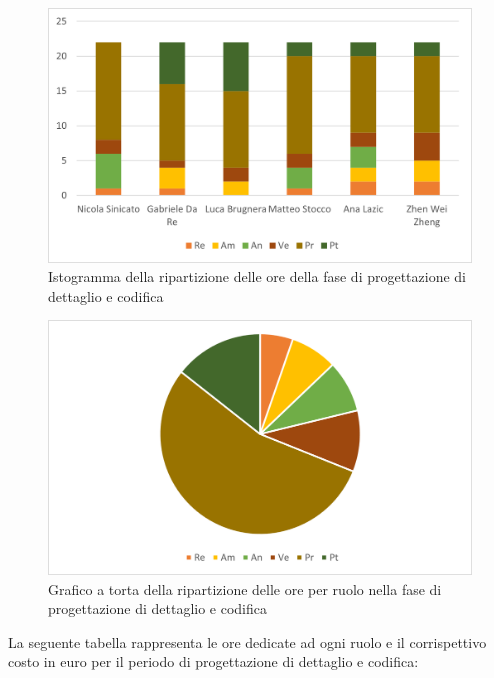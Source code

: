 \begin{figure}[H]
    \centering
    \includegraphics[scale=0.6]{img/grafi preventivo/istogrammi/codifica/complessivo.png}
    \caption{Istogramma della ripartizione delle ore della fase di progettazione di dettaglio e codifica}
\end{figure}
\begin{figure}[H]
    \centering
    \includegraphics[scale=0.6]{img/grafi preventivo/torta/codifica/complessivo.png}
    \caption{Grafico a torta della ripartizione delle ore per ruolo nella fase di progettazione di dettaglio e codifica}
\end{figure}
La seguente tabella rappresenta le ore dedicate ad ogni ruolo e il corrispettivo costo in euro per il periodo di progettazione di dettaglio e codifica:

